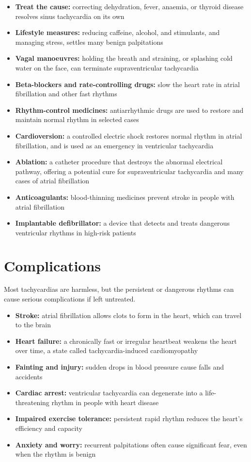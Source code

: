 \begin{itemize}
    \item \textbf{Treat the cause:} correcting dehydration, fever, anaemia, or thyroid disease resolves sinus tachycardia on its own
    \item \textbf{Lifestyle measures:} reducing caffeine, alcohol, and stimulants, and managing stress, settles many benign palpitations
    \item \textbf{Vagal manoeuvres:} holding the breath and straining, or splashing cold water on the face, can terminate supraventricular tachycardia
    \item \textbf{Beta-blockers and rate-controlling drugs:} slow the heart rate in atrial fibrillation and other fast rhythms
    \item \textbf{Rhythm-control medicines:} antiarrhythmic drugs are used to restore and maintain normal rhythm in selected cases
    \item \textbf{Cardioversion:} a controlled electric shock restores normal rhythm in atrial fibrillation, and is used as an emergency in ventricular tachycardia
    \item \textbf{Ablation:} a catheter procedure that destroys the abnormal electrical pathway, offering a potential cure for supraventricular tachycardia and many cases of atrial fibrillation
    \item \textbf{Anticoagulants:} blood-thinning medicines prevent stroke in people with atrial fibrillation
    \item \textbf{Implantable defibrillator:} a device that detects and treats dangerous ventricular rhythms in high-risk patients
\end{itemize}

\section*{Complications}
Most tachycardias are harmless, but the persistent or dangerous rhythms can cause serious complications if left untreated.

\begin{itemize}
    \item \textbf{Stroke:} atrial fibrillation allows clots to form in the heart, which can travel to the brain
    \item \textbf{Heart failure:} a chronically fast or irregular heartbeat weakens the heart over time, a state called tachycardia-induced cardiomyopathy
    \item \textbf{Fainting and injury:} sudden drops in blood pressure cause falls and accidents
    \item \textbf{Cardiac arrest:} ventricular tachycardia can degenerate into a life-threatening rhythm in people with heart disease
    \item \textbf{Impaired exercise tolerance:} persistent rapid rhythm reduces the heart's efficiency and capacity
    \item \textbf{Anxiety and worry:} recurrent palpitations often cause significant fear, even when the rhythm is benign
\end{itemize}

